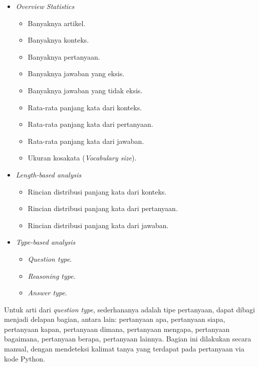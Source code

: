 \begin{itemize}

    \item \emph{Overview Statistics}

        \begin{itemize}
            \item Banyaknya artikel.
            \item Banyaknya konteks.
            \item Banyaknya pertanyaan.
            \item Banyaknya jawaban yang eksis.
            \item Banyaknya jawaban yang tidak eksis.
            \item Rata-rata panjang kata dari konteks.
            \item Rata-rata panjang kata dari pertanyaan.
            \item Rata-rata panjang kata dari jawaban.
            \item Ukuran kosakata (\emph{Vocabulary size}).
        \end{itemize}

    \item \emph{Length-based analysis}

        \begin{itemize}
            \item Rincian distribusi panjang kata dari konteks.
            \item Rincian distribusi panjang kata dari pertanyaan.
            \item Rincian distribusi panjang kata dari jawaban.
        \end{itemize}
        
    \item \emph{Type-based analysis}

        \begin{itemize}
            \item \emph{Question type}.
            \item \emph{Reasoning type}.
            \item \emph{Answer type}.
        \end{itemize}

\end{itemize}

Untuk arti dari \emph{question type}, sederhananya adalah tipe pertanyaan, dapat dibagi menjadi delapan bagian, antara lain: pertanyaan apa, pertanyaan siapa, pertanyaan kapan, pertanyaan dimana, pertanyaan mengapa, pertanyaan bagaimana, pertanyaan berapa, pertanyaan lainnya. Bagian ini dilakukan secara manual, dengan mendeteksi kalimat tanya yang terdapat pada pertanyaan via kode Python.

